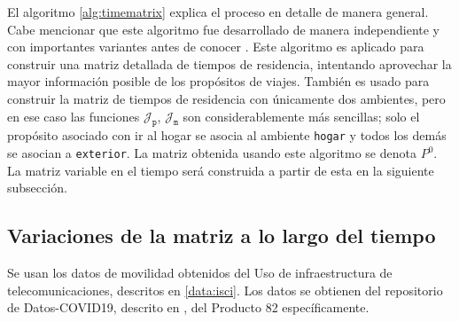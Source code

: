El algoritmo \ref{alg:timematrix} explica el proceso en detalle de manera general. Cabe mencionar que este algoritmo fue desarrollado de manera independiente y con importantes variantes antes de conocer \cite{Munizaga2011}. Este algoritmo es aplicado para construir una matriz detallada de tiempos de residencia, intentando aprovechar la mayor información posible de los propósitos de viajes. También es usado para construir la matriz de tiempos de residencia con únicamente dos ambientes, pero en ese caso las funciones \(\mathcal{J}_{\mathtt{p}}\), \(\mathcal{J}_{\mathtt{m}}\) son considerablemente más sencillas; solo el propósito asociado con ir al hogar se asocia al ambiente \texttt{hogar} y todos los demás se asocian a \texttt{exterior}. La matriz obtenida usando este algoritmo se denota \(P^0\). La matriz variable en el tiempo será construida a partir de esta en la siguiente subsección. 




\subsection{Variaciones de la matriz a lo largo del tiempo} \label{subsec:variaciones}

Se usan los datos de movilidad obtenidos del Uso de infraestructura de telecomunicaciones, descritos en \ref{data:isci}. Los datos se obtienen del repositorio de Datos-COVID19, descrito en \label{sec:datos-minsal}, del Producto 82 específicamente. 



